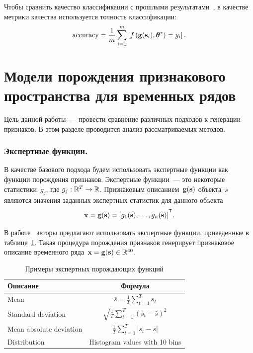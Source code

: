 Чтобы сравнить качество классификации с прошлыми результатами~\cite{karasikov2016feature,ivkin2015ts}, в качестве метрики качества используется точность классификации:
\begin{equation}
	\mathrm{accuracy} = \frac{1}{m} \sum_{i=1}^{m} \left[f\left(\mathbf{g}(\mathbf{s}_i), \boldsymbol{\theta}^* \right)= y_i\right].
	\label{ch6:eq:accuracy}
\end{equation}

\section{Модели порождения признакового пространства для временных рядов}
\label{sec:ch6:feature_generation_models}

Цель данной работы~--- провести сравнение различных подходов к генерации признаков.
В этом разделе проводится анализ рассматриваемых методов.

\subsubsection{Экспертные функции.}
В качестве базового подхода будем использовать экспертные функции как функции порождения признаков.
Экспертные функции~--- это некоторые статистики~$g_j$, где $g_j: \mathbb{R}^T \rightarrow \mathbb{R}$.
Признаковым описанием~$\mathbf{g}(\mathbf{s})$ объекта~$s$ являются значения заданных экспертных статистик для данного объекта
\[
	\bx = \mathbf{g}(\bs) = [g_1(\bs), \dots, g_n(\bs)]^{\T}.
\]

В работе~\cite{kwapisz2011activity} авторы предлагают использовать экспертные функции, приведенные в таблице~\ref{ch6:tbl:expert_functions}.
Такая процедура порождения признаков генерирует признаковое описание временного ряда~$\mathbf{x} = \mathbf{g}(\mathbf{s}) \in \mathbb{R}^{40}$.

\begin{table}[ht]
	\centering
	\caption{Примеры экспертных порождающих функций}
	\begin{tabular}{|l|c|}
		\hline
		\textbf{Описание}    & \textbf{Формула} \\ \hline
		Mean                    & $\bar{s} = \frac{1}{T} \sum_{t=1}^{T} s_t$    \\ \hline
		Standard deviation      & $\sqrt{\frac{1}{T} \sum_{t=1}^{T} (s_t - \bar{s})^2}$    \\ \hline
		Mean absolute deviation & $\frac{1}{T} \sum_{t=1}^{T} |s_t - \bar{s}|$    \\ \hline
		Distribution            &  Histogram values with 10 bins    \\ \hline
	\end{tabular}
	\label{ch6:tbl:expert_functions}
\end{table}

